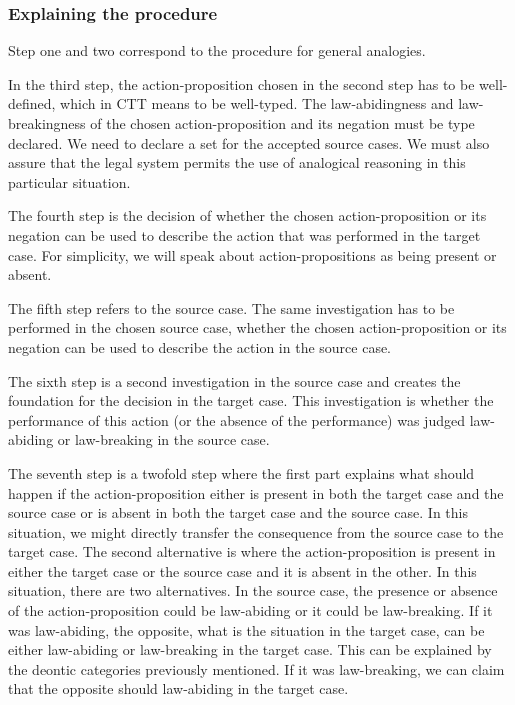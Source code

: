 		\subsubsection{Explaining the procedure}

		Step one and two correspond to the procedure for general analogies. 
		
		In the third step, the action-proposition chosen in the second step has to be well-defined, which in CTT means to be well-typed. The law-abidingness and law-breakingness of the chosen action-proposition and its negation must be type declared. We need to declare a set for the accepted source cases. We must also assure that the legal system permits the use of analogical reasoning in this particular situation. 
		
		The fourth step is the decision of whether the chosen action-proposition or its negation can be used to describe the action that was performed in the target case. For simplicity, we will speak about action-propositions as being present or absent. 
		
		The fifth step refers to the source case. The same investigation has to be performed in the chosen source case, whether the chosen action-proposition or its negation can be used to describe the action in the source case. 
		
		The sixth step is a second investigation in the source case and creates the foundation for the decision in the target case. This investigation is whether the performance of this action (or the absence of the performance) was judged law-abiding or law-breaking in the source case. 
		
		The seventh step is a twofold step where the first part explains what should happen if the action-proposition either is present in both the target case and the source case or is absent in both the target case and the source case. In this situation, we might directly transfer the consequence from the source case to the target case. The second alternative is where the action-proposition is present in either the target case or the source case and it is absent in the other. In this situation, there are two alternatives. In the source case, the presence or absence of the action-proposition could be law-abiding or it could be law-breaking. If it was law-abiding, the opposite, what is the situation in the target case, can be either law-abiding or law-breaking in the target case. This can be explained by the deontic categories previously mentioned. If it was law-breaking, we can claim that the opposite should law-abiding in the target case. 
		

